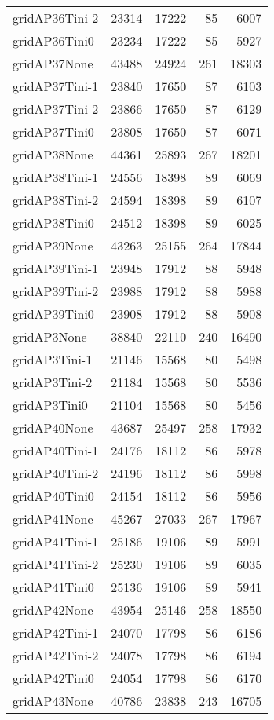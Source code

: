 \begin{longtable}{lrrrr}
gridAP36Tini-2 & 23314 & 17222 & 85 & 6007 \\
gridAP36Tini0 & 23234 & 17222 & 85 & 5927 \\
gridAP37None & 43488 & 24924 & 261 & 18303 \\
gridAP37Tini-1 & 23840 & 17650 & 87 & 6103 \\
gridAP37Tini-2 & 23866 & 17650 & 87 & 6129 \\
gridAP37Tini0 & 23808 & 17650 & 87 & 6071 \\
gridAP38None & 44361 & 25893 & 267 & 18201 \\
gridAP38Tini-1 & 24556 & 18398 & 89 & 6069 \\
gridAP38Tini-2 & 24594 & 18398 & 89 & 6107 \\
gridAP38Tini0 & 24512 & 18398 & 89 & 6025 \\
gridAP39None & 43263 & 25155 & 264 & 17844 \\
gridAP39Tini-1 & 23948 & 17912 & 88 & 5948 \\
gridAP39Tini-2 & 23988 & 17912 & 88 & 5988 \\
gridAP39Tini0 & 23908 & 17912 & 88 & 5908 \\
gridAP3None & 38840 & 22110 & 240 & 16490 \\
gridAP3Tini-1 & 21146 & 15568 & 80 & 5498 \\
gridAP3Tini-2 & 21184 & 15568 & 80 & 5536 \\
gridAP3Tini0 & 21104 & 15568 & 80 & 5456 \\
gridAP40None & 43687 & 25497 & 258 & 17932 \\
gridAP40Tini-1 & 24176 & 18112 & 86 & 5978 \\
gridAP40Tini-2 & 24196 & 18112 & 86 & 5998 \\
gridAP40Tini0 & 24154 & 18112 & 86 & 5956 \\
gridAP41None & 45267 & 27033 & 267 & 17967 \\
gridAP41Tini-1 & 25186 & 19106 & 89 & 5991 \\
gridAP41Tini-2 & 25230 & 19106 & 89 & 6035 \\
gridAP41Tini0 & 25136 & 19106 & 89 & 5941 \\
gridAP42None & 43954 & 25146 & 258 & 18550 \\
gridAP42Tini-1 & 24070 & 17798 & 86 & 6186 \\
gridAP42Tini-2 & 24078 & 17798 & 86 & 6194 \\
gridAP42Tini0 & 24054 & 17798 & 86 & 6170 \\
gridAP43None & 40786 & 23838 & 243 & 16705 \\

\end{longtable}
